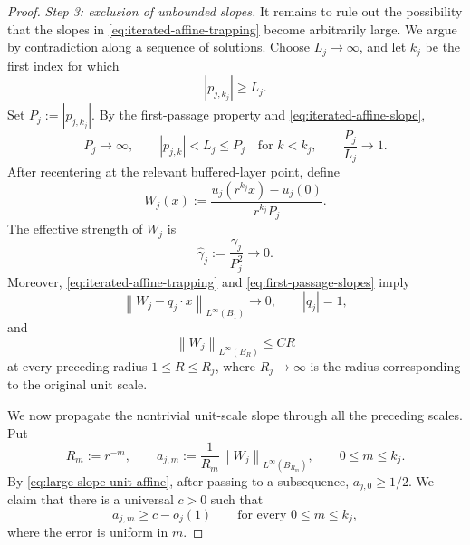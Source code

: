\documentclass[11pt,letterpaper]{amsart}
\numberwithin{equation}{section}
\newcommand{\norm}[1]{\left\lVert #1\right\rVert}
\theoremstyle{definition}
\theoremstyle{remark}
\begin{document}
\begin{proof}
\medskip
\noindent
\emph{Step 3: exclusion of unbounded slopes.}
It remains to rule out the possibility that the slopes in
\eqref{eq:iterated-affine-trapping} become arbitrarily large. We argue by
contradiction along a sequence of solutions. Choose $L_j\to\infty$, and let
$k_j$ be the first index for which
$$
|p_{j,k_j}|\geq L_j.
$$
Set $P_j:=|p_{j,k_j}|$. By the first-passage property and
\eqref{eq:iterated-affine-slope},
\begin{equation}\label{eq:first-passage-slopes}
P_j\longrightarrow\infty,
\qquad
|p_{j,k}|<L_j\leq P_j\quad\text{for }k<k_j,
\qquad
\frac{P_j}{L_j}\longrightarrow1.
\end{equation}
After recentering at the relevant buffered-layer point, define
\begin{equation}\label{eq:large-slope-blowup}
W_j(x)
:=
\frac{u_j(r^{k_j}x)-u_j(0)}{r^{k_j}P_j}.
\end{equation}
The effective strength of $W_j$ is
$$
\widehat\gamma_j
:=
\frac{\gamma_j}{P_j^2}
\longrightarrow0.
$$
Moreover, \eqref{eq:iterated-affine-trapping} and
\eqref{eq:first-passage-slopes} imply
\begin{equation}\label{eq:large-slope-unit-affine}
\norm{W_j-q_j\cdot x}_{L^\infty(B_1)}\longrightarrow0,
\qquad
|q_j|=1,
\end{equation}
and
\begin{equation}\label{eq:large-slope-linear-upper-growth}
\norm{W_j}_{L^\infty(B_R)}
\leq C R
\end{equation}
at every preceding radius $1\leq R\leq R_j$, where $R_j\to\infty$ is the
radius corresponding to the original unit scale.

We now propagate the nontrivial unit-scale slope through all the preceding
scales.  Put
$$
R_m:=r^{-m},
\qquad
a_{j,m}:=\frac1{R_m}\norm{W_j}_{L^\infty(B_{R_m})},
\qquad
0\leq m\leq k_j.
$$
By \eqref{eq:large-slope-unit-affine}, after passing to a subsequence,
$a_{j,0}\geq1/2$.  We claim that there is a universal $c>0$ such that
\begin{equation}\label{eq:backward-slope-propagation}
a_{j,m}\geq c-o_j(1)
\qquad
\text{for every }0\leq m\leq k_j,
\end{equation}
where the error is uniform in $m$.


\end{proof}
\end{document}
